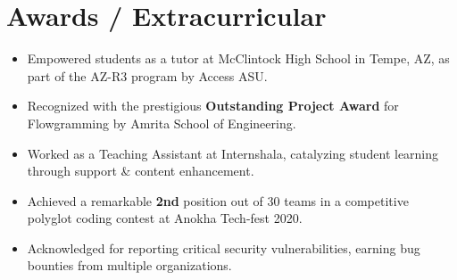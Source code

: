 \documentclass[letterpaper,11pt]{article}
\newcommand{\resumeItem}[1]{
  \item\small{
    {#1 \vspace{-2pt}}
  }
}
\newcommand{\resumeItemListStart}{\begin{itemize}}
\newcommand{\resumeItemListEnd}{\end{itemize}\vspace{-5pt}}
\begin{document}
\section{Awards / Extracurricular}
            \resumeItemListStart[leftmargin=0.13in]
                        	\resumeItem{Empowered students as a tutor at McClintock High School in Tempe, AZ, as part of the AZ-R3 program by Access ASU.}\vspace{-5pt}
            	\resumeItem{Recognized with the prestigious \textbf{Outstanding Project Award} for Flowgramming by Amrita School of Engineering.}\vspace{-5pt}
            	\resumeItem{Worked as a Teaching Assistant at Internshala, catalyzing student learning through support \& content enhancement.}
\vspace{-5pt}            	            
                \resumeItem{Achieved a remarkable \textbf{2nd} position out of 30 teams in a competitive polyglot coding contest at Anokha Tech-fest 2020.}\vspace{-5pt}
                \resumeItem{Acknowledged for reporting critical security vulnerabilities, earning bug bounties from multiple organizations.}\vspace{-5pt}
            \resumeItemListEnd
\end{document}
